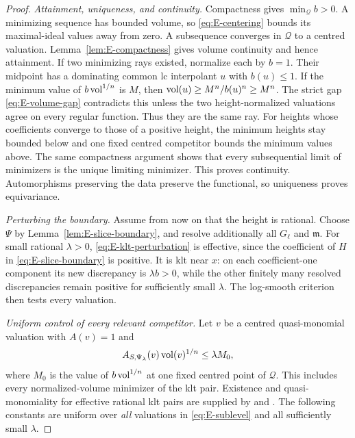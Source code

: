 \begin{proof}
\emph{Attainment, uniqueness, and continuity.}
Compactness gives $\min_{\mathcal Q}b>0$.
A minimizing sequence has bounded volume, so
\eqref{eq:E-centering} bounds its maximal-ideal values away from zero.
A subsequence converges in $\mathcal Q$ to a centred valuation.
Lemma~\ref{lem:E-compactness} gives volume continuity and hence
attainment. If two minimizing rays existed, normalize each by $b=1$.
Their midpoint has a dominating common lc interpolant $u$ with
$b(u)\le1$. If the minimum value of $b\operatorname{vol}^{1/n}$ is $M$, then
$\operatorname{vol}(u)\ge M^n/b(u)^n\ge M^n$.
The strict gap \eqref{eq:E-volume-gap} contradicts this unless the
two height-normalized valuations agree on every regular function.
Thus they are the same ray. For heights whose coefficients converge
to those of a positive height, the minimum heights stay bounded below
and one fixed centred competitor bounds the minimum values above.
The same compactness argument shows that every subsequential limit
of minimizers is the unique limiting minimizer. This proves continuity.
Automorphisms preserving the data preserve the functional, so
uniqueness proves equivariance.

\emph{Perturbing the boundary.}
Assume from now on that the height is rational. Choose $\Psi$ by
Lemma~\ref{lem:E-slice-boundary}, and resolve additionally all
$G_\ell$ and $\mathfrak m$.
For small rational $\lambda>0$, \eqref{eq:E-klt-perturbation} is
effective, since the coefficient of $H$ in \eqref{eq:E-slice-boundary}
is positive. It is klt near $x$: on each coefficient-one component
its new discrepancy is $\lambda b>0$, while the other finitely many
resolved discrepancies remain positive for sufficiently small
$\lambda$. The log-smooth criterion then tests every valuation.

\emph{Uniform control of every relevant competitor.}
Let $v$ be a centred quasi-monomial valuation with $A(v)=1$ and
\begin{equation}\label{eq:E-sublevel}
 A_{S,\Psi_\lambda}(v)\operatorname{vol}(v)^{1/n}\le\lambda M_0,
\end{equation}
where $M_0$ is the value of $b\operatorname{vol}^{1/n}$ at one fixed centred point
of $\mathcal Q$. This includes every normalized-volume minimizer of
the klt pair. Existence and quasi-monomiality for effective rational
klt pairs are supplied by \cite[Section~7]{Blum} and
\cite[Theorem~1.2]{XuQuasimonomial}.
The following constants are uniform over \emph{all} valuations in
\eqref{eq:E-sublevel} and all sufficiently small $\lambda$.


\end{proof}

